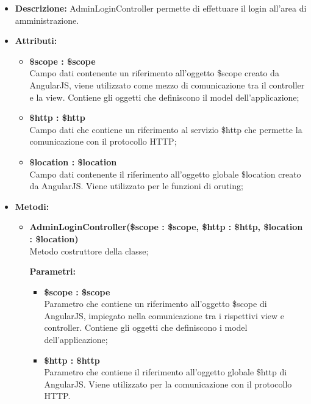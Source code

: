 \begin{itemize}
	\item \textbf{Descrizione:} AdminLoginController permette di effettuare il login all'area di amministrazione.
	\item \textbf{Attributi:}
	\begin{itemize}
		
		\item \textbf{\$scope : \$scope}\\
		Campo dati contenente un riferimento all'oggetto \$scope creato da AngularJS, viene utilizzato come mezzo di comunicazione tra il controller e la view. Contiene gli oggetti che definiscono il model dell'applicazione;
		
		\item \textbf{\$http : \$http }\\
		Campo dati che contiene un riferimento al servizio \$http che permette la comunicazione con il protocollo HTTP;
		
		\item \textbf{\$location : \$location }\\
		Campo dati contenente il riferimento all'oggetto globale \$location creato da AngularJS. Viene utilizzato per le funzioni di oruting;
		
		
	\end{itemize}
	\item \textbf{Metodi:}
	\begin{itemize}
		
		\item \textbf{AdminLoginController(\$scope : \$scope, \$http : \$http, \$location : \$location)}\\
		Metodo costruttore della classe;
		\begin{description}
			\item[\textbf{Parametri:}]
		\end{description}
		\begin{itemize}
			\item \textbf{\$scope : \$scope}\\
			Parametro che contiene un riferimento all'oggetto \$scope di AngularJS, impiegato nella comunicazione tra i rispettivi view e controller. Contiene gli oggetti che definiscono i model dell'applicazione;
			
			\item \textbf{\$http : \$http}\\
			Parametro che contiene il riferimento all'oggetto globale \$http di AngularJS. Viene utilizzato per la comunicazione con il protocollo HTTP.
			

\end{itemize}
\end{itemize}
\end{itemize}
